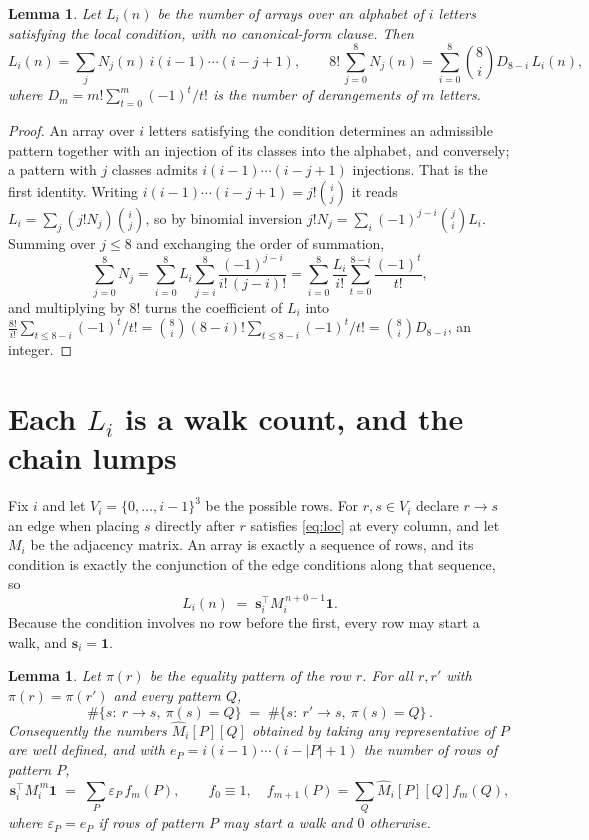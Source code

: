 \documentclass[11pt,a4paper]{article}
\theoremstyle{plain}
\newtheorem{lemma}[theorem]{Lemma}
\theoremstyle{definition}
\begin{document}
\begin{lemma}\label{lem:inv}
Let $L_i(n)$ be the number of arrays over an alphabet of $i$ letters satisfying the local
condition, with no canonical-form clause. Then
\[
L_i(n)=\sum_j N_j(n)\,i(i-1)\cdots(i-j+1),
\qquad
8!\,\sum_{j=0}^{8}N_j(n)=\sum_{i=0}^{8}\binom{8}{i}D_{8-i}\,L_i(n),
\]
where $D_m=m!\sum_{t=0}^{m}(-1)^t/t!$ is the number of derangements of $m$ letters.
\end{lemma}

\begin{proof}
An array over $i$ letters satisfying the condition determines an admissible pattern together
with an injection of its classes into the alphabet, and conversely; a pattern with $j$
classes admits $i(i-1)\cdots(i-j+1)$ injections. That is the first identity. Writing
$i(i-1)\cdots(i-j+1)=j!\binom{i}{j}$ it reads $L_i=\sum_j (j!N_j)\binom{i}{j}$, so by
binomial inversion $j!N_j=\sum_{i}(-1)^{j-i}\binom{j}{i}L_i$. Summing over
$j\le 8$ and exchanging the order of summation,
\[
\sum_{j=0}^{8}N_j=\sum_{i=0}^{8}L_i\sum_{j=i}^{8}\frac{(-1)^{j-i}}{i!\,(j-i)!}
=\sum_{i=0}^{8}\frac{L_i}{i!}\sum_{t=0}^{8-i}\frac{(-1)^t}{t!} ,
\]
and multiplying by $8!$ turns the coefficient of $L_i$ into
$\frac{8!}{i!}\sum_{t\le 8-i}(-1)^t/t!=\binom{8}{i}(8-i)!\sum_{t\le 8-i}(-1)^t/t!
=\binom{8}{i}D_{8-i}$, an integer.
\end{proof}

\section{Each $L_i$ is a walk count, and the chain lumps}

Fix $i$ and let $V_i=\{0,\dots,i-1\}^{3}$ be the possible rows. For $r,s\in V_i$
declare $r\to s$ an edge when placing $s$ directly after $r$ satisfies \eqref{eq:loc} at
every column, and let $M_i$ be the adjacency matrix. An array is exactly a sequence of
rows, and its condition is exactly the conjunction of the edge conditions along that
sequence, so
\[
L_i(n)\;=\;\mathbf{s}_i^{\!\top}M_i^{\,n+0-1}\mathbf{1} .
\]
Because the condition involves no row before the first, every
row may start a walk, and $\mathbf{s}_i=\mathbf{1}$.

\begin{lemma}\label{lem:lump}
Let $\pi(r)$ be the equality pattern of the row $r$. For all $r,r'$ with
$\pi(r)=\pi(r')$ and every pattern $Q$,
\[
\#\{s:\ r\to s,\ \pi(s)=Q\}\;=\;\#\{s:\ r'\to s,\ \pi(s)=Q\}\, .
\]
Consequently the numbers $\widehat M_i[P][Q]$ obtained by taking any representative of $P$
are well defined, and with $e_P=i(i-1)\cdots(i-|P|+1)$ the number of rows of pattern $P$,
\[
\mathbf{s}_i^{\!\top}M_i^{\,m}\mathbf{1}\;=\;\sum_P \varepsilon_P\,f_m(P),
\qquad f_0\equiv1,\quad f_{m+1}(P)=\sum_Q\widehat M_i[P][Q]f_m(Q),
\]
where $\varepsilon_P=e_P$ if rows of pattern $P$ may start a walk and $0$ otherwise.
\end{lemma}
\end{document}
